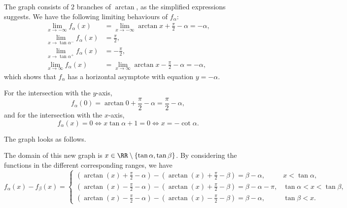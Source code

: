 \begin{enumerate}
          The graph consists of \(2\) branches of \(\arctan\), as the simplified expressions suggests. We have the following limiting behaviours of \(f_{\alpha}\):
          \begin{align*}
              \lim_{x \to -\infty} f_{\alpha} (x)         & = \lim_{x \to -\infty} \arctan x + \frac{\pi}{2} - \alpha = -\alpha, \\
              \lim_{x \to \tan \alpha^{-}} f_{\alpha} (x) & = \frac{\pi}{2},                                                     \\
              \lim_{x \to \tan \alpha^{+}} f_{\alpha} (x) & = -\frac{\pi}{2},                                                    \\
              \lim_{x \to \infty} f_{\alpha} (x)          & = \lim_{x \to \infty} \arctan x - \frac{\pi}{2} - \alpha = -\alpha,
          \end{align*}
          which shows that \(f_{\alpha}\) has a horizontal asymptote with equation \(y = -\alpha\).

          For the intersection with the \(y\)-axis,
          \[
              f_{\alpha} (0) = \arctan 0 + \frac{\pi}{2} - \alpha = \frac{\pi}{2} - \alpha,
          \]
          and for the intersection with the \(x\)-axis,
          \[
              f_{\alpha} (x) = 0 \iff x \tan \alpha + 1 = 0\iff x = - \cot \alpha.
          \]

          The graph looks as follows.

          \begin{center}
              
          \end{center}

          The domain of this new graph is \(x \in \RR \setminus \{\tan \alpha, \tan \beta\}\). By considering the functions in the different corresponding ranges, we have
          \[
              f_{\alpha} (x) - f_{\beta}(x) = \begin{cases}
                  \left(\arctan(x) + \frac{\pi}{2} - \alpha\right) - \left(\arctan(x) + \frac{\pi}{2} - \beta\right) = \beta - \alpha,       & x < \tan \alpha,              \\
                  \left(\arctan(x) - \frac{\pi}{2} - \alpha\right) - \left(\arctan(x) + \frac{\pi}{2} - \beta\right) = \beta - \alpha - \pi, & \tan \alpha < x < \tan \beta, \\
                  \left(\arctan(x) - \frac{\pi}{2} - \alpha\right) - \left(\arctan(x) - \frac{\pi}{2} - \beta\right) = \beta - \alpha,       & \tan \beta < x.
              \end{cases}
          \]


\end{enumerate}
